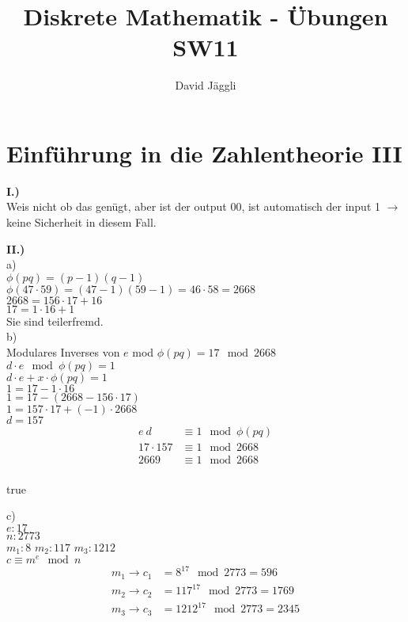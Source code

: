 \documentclass[12pt]{scrartcl}
\author{David Jäggli}
\title{Diskrete Mathematik - Übungen SW11}
\begin{document}
\maketitle

\tableofcontents

\newpage
\section{Einführung in die Zahlentheorie III}
\textbf{I.)}\\
Weis nicht ob das genügt, aber ist der output 00, ist automatisch der input 1 $\rightarrow$ 
keine Sicherheit in diesem Fall.


\vspace{1.5cm}
\textbf{II.)}\\
a)\\
$\phi (pq) = (p-1)(q-1)$\\
$\phi (47 \cdot 59) = (47-1)(59-1) = 46 \cdot 58 = 2668$\\

$2668 = 156 \cdot 17 + 16$\\
$17 = 1 \cdot 16 + 1$\\

Sie sind teilerfremd.\\

b)\\
Modulares Inverses von $e$ mod $\phi(pq) = 17 \mod 2668$\\
$d \cdot e \mod \phi(pq) = 1$\\
$d \cdot e + x \cdot \phi(pq) = 1$\\

$1 = 17 - 1 \cdot 16$\\
$1 = 17 - (2668 - 156 \cdot 17)$\\
$1 = 157 \cdot 17 + (-1) \cdot 2668$\\
$d = 157$\\

\begin{align*}
    e\ d            &\equiv 1 \mod \phi(pq)\\
    17 \cdot 157    &\equiv 1 \mod 2668\\
    2669            &\equiv 1 \mod 2668\\
\end{align*}

true


\newpage
c)\\
$e: 17$\\
$n: 2773$\\
$m_1: 8$ $m_2: 117$ $m_3: 1212$\\
$c \equiv m^e \mod n$
\begin{align*}
    m_1 \rightarrow c_1 &= 8^{17} \mod 2773 = 596\\
    m_2 \rightarrow c_2 &= 117^{17} \mod 2773 = 1769\\
    m_3 \rightarrow c_3 &= 1212^{17} \mod 2773 = 2345\\
\end{align*}
\end{document}
